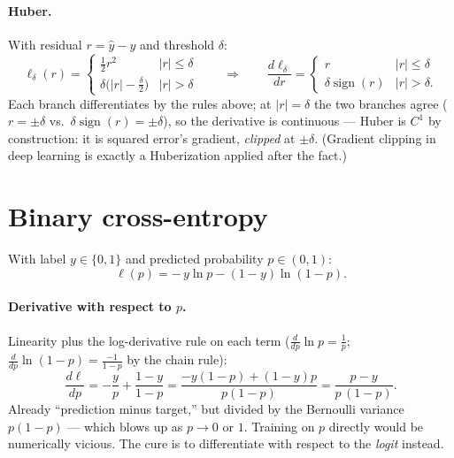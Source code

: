 \documentclass[11pt]{article}
\begin{document}
\paragraph{Huber.} With residual $r = \hat y - y$ and threshold
$\delta$:
\begin{equation}
  \ell_{\delta}(r) =
  \begin{cases}
    \tfrac12 r^{2} & |r| \le \delta\\[2pt]
    \delta\bigl(|r| - \tfrac{\delta}{2}\bigr) & |r| > \delta
  \end{cases}
  \qquad\Longrightarrow\qquad
  \frac{d\ell_{\delta}}{dr} =
  \begin{cases}
    r & |r| \le \delta\\[2pt]
    \delta\operatorname{sign}(r) & |r| > \delta.
  \end{cases}
  \label{eq:huberprime}
\end{equation}
Each branch differentiates by the rules above; at $|r| = \delta$ the
two branches agree ($r = \pm\delta$ vs.\
$\delta\operatorname{sign}(r) = \pm\delta$), so the derivative is
continuous --- Huber is $C^1$ by construction: it is squared error's
gradient, \emph{clipped} at $\pm\delta$. (Gradient clipping in deep
learning is exactly a Huberization applied after the fact.)

\section{Binary cross-entropy}

With label $y \in \{0,1\}$ and predicted probability $p \in (0,1)$:
\begin{equation}
  \ell(p) = -\,y\ln p - (1-y)\ln(1-p).
  \label{eq:bce}
\end{equation}

\paragraph{Derivative with respect to $p$.} Linearity plus the
log-derivative rule on each term
($\frac{d}{dp}\ln p = \frac1p$;
$\frac{d}{dp}\ln(1-p) = \frac{-1}{1-p}$ by the chain rule):
\begin{equation}
  \frac{d\ell}{dp}
  = -\frac{y}{p} + \frac{1-y}{1-p}
  = \frac{-y(1-p) + (1-y)p}{p(1-p)}
  = \frac{p - y}{p\,(1-p)}.
  \label{eq:bceprimep}
\end{equation}
Already ``prediction minus target,'' but divided by the Bernoulli
variance $p(1-p)$ --- which blows up as $p \to 0$ or $1$. Training on
$p$ directly would be numerically vicious. The cure is to differentiate
with respect to the \emph{logit} instead.
\end{document}
